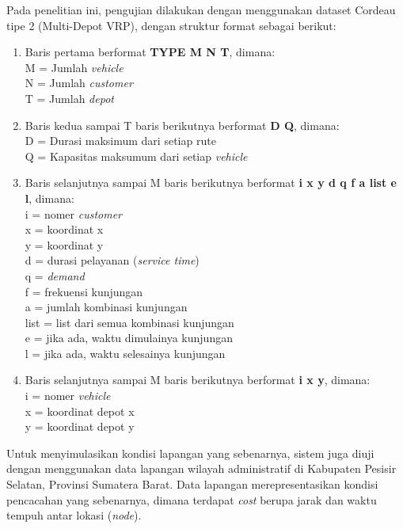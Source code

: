 Pada penelitian ini, pengujian dilakukan dengan menggunakan dataset Cordeau tipe 2 (Multi-Depot VRP), dengan struktur format sebagai berikut:
\begin{enumerate}
	\item Baris pertama berformat \textbf{TYPE M N T}, dimana: \\
	M = Jumlah \textit{vehicle} \\
	N = Jumlah \textit{customer} \\
	T = Jumlah \textit{depot}
	
	\item Baris kedua sampai T baris berikutnya berformat \textbf{D Q}, dimana: \\
	D = Durasi maksimum dari setiap rute \\
	Q = Kapasitas maksumum dari setiap \textit{vehicle}
	
	\item Baris selanjutnya sampai M baris berikutnya berformat \textbf{i x y d q f a list e l}, dimana: \\
	i	= nomer \textit{customer} \\
	x	= koordinat x \\
	y	= koordinat y \\
	d	= durasi pelayanan (\textit{service time}) \\
	q	= \textit{demand} \\
	f	= frekuensi kunjungan \\
	a	= jumlah kombinasi kunjungan \\
	list	= list dari semua kombinasi kunjungan \\
	e	= jika ada, waktu dimulainya kunjungan \\
	l	= jika ada, waktu selesainya kunjungan
	
	\item Baris selanjutnya sampai M baris berikutnya berformat \textbf{i x y}, dimana: \\
	i	= nomer \textit{vehicle} \\
	x	= koordinat depot x \\
	y	= koordinat depot y \\
\end{enumerate}

Untuk menyimulasikan kondisi lapangan yang sebenarnya, sistem juga diuji dengan menggunakan data lapangan wilayah administratif di Kabupaten Pesisir Selatan, Provinsi Sumatera Barat. Data lapangan merepresentasikan kondisi pencacahan yang sebenarnya, dimana terdapat \textit{cost} berupa jarak dan waktu tempuh antar lokasi (\textit{node}). 

